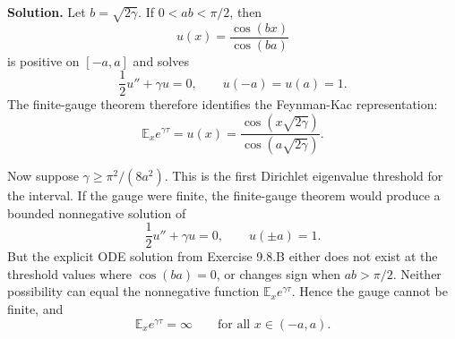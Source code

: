 \documentclass[11pt]{article}
\newcommand{\E}{\mathbb{E}}
\begin{document}
\noindent\textbf{Solution.}
Let $b=\sqrt{2\gamma}$.  If $0<ab<\pi/2$, then
\[
  u(x)=\frac{\cos(bx)}{\cos(ba)}
\]
is positive on $[-a,a]$ and solves
\[
  \frac12u''+\gamma u=0,
  \qquad
  u(-a)=u(a)=1.
\]
The finite-gauge theorem therefore identifies the Feynman-Kac
representation:
\[
  \E_xe^{\gamma\tau}=u(x)
  =
  \frac{\cos(x\sqrt{2\gamma})}{\cos(a\sqrt{2\gamma})}.
\]

Now suppose $\gamma\ge\pi^2/(8a^2)$.  This is the first Dirichlet
eigenvalue threshold for the interval.  If the gauge were finite, the
finite-gauge theorem would produce a bounded nonnegative solution of
\[
  \frac12u''+\gamma u=0,\qquad u(\pm a)=1.
\]
But the explicit ODE solution from Exercise 9.8.B either does not exist
at the threshold values where $\cos(ba)=0$, or changes sign when
$ab>\pi/2$.  Neither possibility can equal the nonnegative function
$\E_xe^{\gamma\tau}$.  Hence the gauge cannot be finite, and
\[
  \E_xe^{\gamma\tau}=\infty
  \qquad\text{for all }x\in(-a,a).
\]
\end{document}
